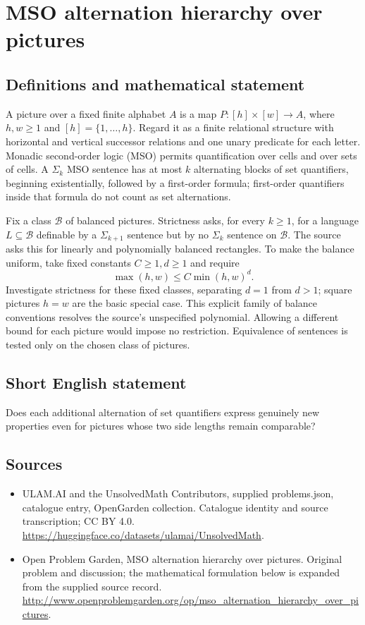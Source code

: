 \documentclass[11pt,a4paper]{article}
\begin{document}
\section*{MSO alternation hierarchy over pictures}\label{statement}

\subsection{Definitions and mathematical statement}
A picture over a fixed finite alphabet $A$ is a map
$P:[h]\times[w]\to A$, where $h,w\ge1$ and $[h]=\{1,\ldots,h\}$.
Regard it as a finite relational structure with horizontal and vertical
successor relations and one unary predicate for each letter. Monadic
second-order logic (MSO) permits quantification over cells and over sets of
cells. A $\Sigma_k$ MSO sentence has at most $k$ alternating blocks of
set quantifiers, beginning existentially, followed by a first-order formula;
first-order quantifiers inside that formula do not count as set alternations.

Fix a class $\mathcal B$ of balanced pictures. Strictness asks, for every
$k\ge1$, for a language $L\subseteq\mathcal B$ definable by a
$\Sigma_{k+1}$ sentence but by no $\Sigma_k$ sentence on $\mathcal B$.
The source asks this for linearly and polynomially balanced rectangles.
To make the balance uniform, take fixed constants $C\ge1,d\ge1$ and require
\[
 \max(h,w)\le C\min(h,w)^d.
\]
Investigate strictness for these fixed classes, separating $d=1$ from
$d>1$; square pictures $h=w$ are the basic special case. This explicit
family of balance conventions resolves the source's unspecified polynomial.
Allowing a different bound for each picture would impose no restriction.
Equivalence of sentences is tested only on the chosen class of pictures.
\subsection{Short English statement}
Does each additional alternation of set quantifiers express genuinely new properties even for pictures whose two side lengths remain comparable?
\subsection{Sources}
\begin{itemize}
\item[S1] ULAM.AI and the UnsolvedMath Contributors, supplied problems.json, catalogue entry, OpenGarden collection. Catalogue identity and source transcription; CC BY 4.0.
\url{https://huggingface.co/datasets/ulamai/UnsolvedMath}.
\item[S2] Open Problem Garden, MSO alternation hierarchy over pictures. Original problem and discussion; the mathematical formulation below is expanded from the supplied source record.
\url{http://www.openproblemgarden.org/op/mso_alternation_hierarchy_over_pictures}.
\end{itemize}
\end{document}
